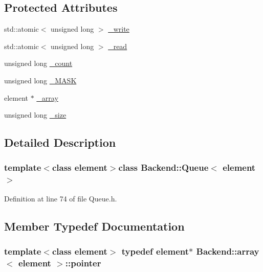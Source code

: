 \subsection*{Protected Attributes}
\begin{DoxyCompactItemize}
\item 
std\+::atomic$<$ unsigned long $>$ \hyperlink{class_backend_1_1_queue_ab3d5c4738092cf356b36c56f6ab61554}{\+\_\+write}
\item 
std\+::atomic$<$ unsigned long $>$ \hyperlink{class_backend_1_1_queue_a508eb8c4fedb73fc4abbf26353bdfd82}{\+\_\+read}
\item 
unsigned long \hyperlink{class_backend_1_1_queue_ab49d17e24dc0f8a2e5e44c182c240249}{\+\_\+count}
\item 
unsigned long \hyperlink{class_backend_1_1_queue_ab665bcab528d6bad6c4faab1ae0fc1b4}{\+\_\+\+M\+A\+S\+K}
\item 
element $\ast$ \hyperlink{class_backend_1_1array_ac588c1e30c2c4748bc9a5bb12b9320af}{\+\_\+array}
\item 
unsigned long \hyperlink{class_backend_1_1array_ae51d64e87b42931946111c28b98e8a18}{\+\_\+size}
\end{DoxyCompactItemize}


\subsection{Detailed Description}
\subsubsection*{template$<$class element$>$class Backend\+::\+Queue$<$ element $>$}



Definition at line 74 of file Queue.\+h.



\subsection{Member Typedef Documentation}
\hypertarget{class_backend_1_1array_a6d8785dc8b979153ef122f4e3bad1408}{
\subsubsection[{pointer}]{\setlength{\rightskip}{0pt plus 5cm}template$<$class element$>$ typedef element$\ast$ {\bf Backend\+::array}$<$ element $>$\+::{\bf pointer}\hspace{0.3cm}{\ttfamily [inherited]}}}\label{class_backend_1_1array_a6d8785dc8b979153ef122f4e3bad1408}


